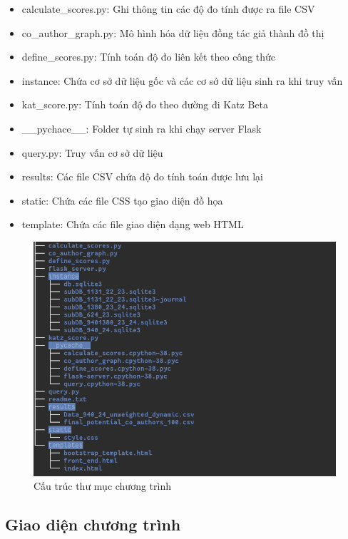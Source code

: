 \documentclass{article}
\begin{document}
\begin{itemize}
	\item calculate\_scores.py: Ghi thông tin các độ đo tính được ra file CSV
	\item co\_author\_graph.py: Mô hình hóa dữ liệu đồng tác giả thành đồ thị
	\item define\_scores.py: Tính toán độ đo liên kết theo công thức
	\item instance: Chứa cơ sở dữ liệu gốc và các cơ sở dữ liệu sinh ra khi truy vấn
	\item kat\_score.py: Tính toán độ đo theo đường đi Katz Beta
	\item \_\_pychace\_\_: Folder tự sinh ra khi chạy server Flask
	\item query.py: Truy vấn cơ sở dữ liệu
	\item results: Các file CSV chứa độ đo tính toán được lưu lại
	\item static: Chứa các file CSS tạo giao diện đồ họa
	\item template: Chứa các file giao diện dạng web HTML 
\end{itemize}

\begin{figure}[h]
\includegraphics[width=1\textwidth]{image/tree_folder.png}
\caption{Cấu trúc thư mục chương trình}
\end{figure}

\newpage

\subsection{Giao diện chương trình}
\end{document}
